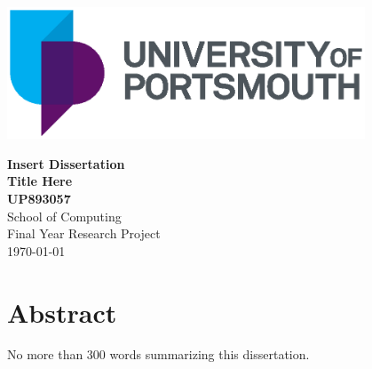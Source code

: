\documentclass[12pt, a4paper]{report}
\begin{document}
\thispagestyle{empty}	%
\vspace*{1mm}	%
\includegraphics[width=0.8\textwidth, center]{figures/UoP_Master_Logo_Linear_PMS.eps}
\vspace{10mm}

\begin{center}
\huge\textbf{\textsf{Insert Dissertation\\Title Here}}\\
\vspace{15mm}
\large \textbf{UP893057}\\


\vspace{10mm}
\normalsize School of Computing \\ Final Year Research Project \\

\vspace{20mm}
%
\today	%
\end{center}
\newpage
{}	%
\chapter*{Abstract}	%

No more than 300 words summarizing this dissertation.

\newpage
\renewcommand{\contentsname}{Table of Contents}	%
\tableofcontents
\end{document}
